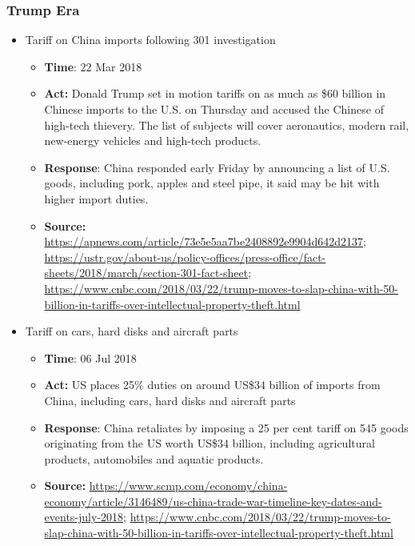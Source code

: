\documentclass[12pt]{article} %
\begin{document}
		\subsubsection{Trump Era}
			\begin{itemize}
			\item	Tariff on China imports following 301 investigation
				\begin{itemize}
				\item \textbf{Time}: 22 Mar 2018
				\item \textbf{Act:} Donald Trump set in motion tariffs on as much as \$60 billion in Chinese imports to the U.S. on Thursday and accused the Chinese of high-tech thievery. The list of subjects will cover aeronautics, modern rail, new-energy vehicles and high-tech products.
				\item \textbf{Response}: China responded early Friday by announcing a list of U.S. goods, including pork, apples and steel pipe, it said may be hit with higher import duties.
				\item	\textbf{Source:} \url{https://apnews.com/article/73e5e5aa7be2408892e9904d642d2137}; \url{https://ustr.gov/about-us/policy-offices/press-office/fact-sheets/2018/march/section-301-fact-sheet}; \url{https://www.cnbc.com/2018/03/22/trump-moves-to-slap-china-with-50-billion-in-tariffs-over-intellectual-property-theft.html}
				\end{itemize}

			\item	Tariff on cars, hard disks and aircraft parts
				\begin{itemize}
				\item \textbf{Time}: 06 Jul 2018
				\item \textbf{Act:} US places 25\% duties on around US\$34 billion of imports from China, including cars, hard disks and aircraft parts
				\item \textbf{Response}: China retaliates by imposing a 25 per cent tariff on 545 goods originating from the US worth US\$34 billion, including agricultural products, automobiles and aquatic products.
				\item	\textbf{Source:} \url{https://www.scmp.com/economy/china-economy/article/3146489/us-china-trade-war-timeline-key-dates-and-events-july-2018}; \url{https://www.cnbc.com/2018/03/22/trump-moves-to-slap-china-with-50-billion-in-tariffs-over-intellectual-property-theft.html}
				\end{itemize}
			

\end{itemize}
\end{document}
